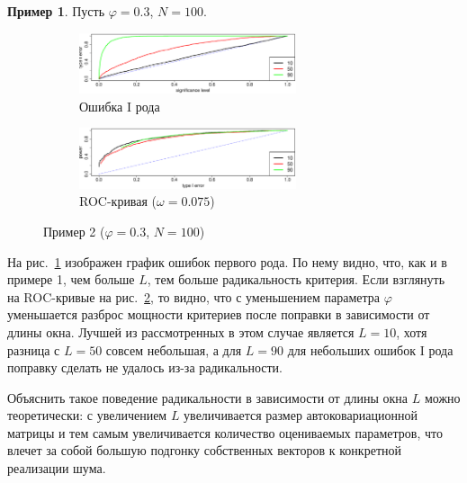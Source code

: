 \documentclass[specialist,
substylefile = spbu_report.rtx,
subf,href,colorlinks=true, 12pt]{disser}
\theoremstyle{definition}
\newtheorem{example}{Пример}
\begin{document}
\begin{example}\label{example2}
	Пусть $\varphi=0.3$, $N=100$.
	\begin{figure}[h!]
		\captionsetup[subfigure]{justification=Centering}
		\begin{subfigure}[t]{\textwidth}
			\centering
			\includegraphics[width=0.7\textwidth]{../cps2024/images/alphaI_phi3_N100.eps}
			\caption{Ошибка I рода}
			\label{alphaI_phi3_N100}
		\end{subfigure}
		\begin{subfigure}[t]{\textwidth}
			\centering
			\includegraphics[width=0.7\textwidth]{../cps2024/images/roc_phi3_N100.eps}
			\caption{ROC-кривая ($\omega=0.075$)}
			\label{roc_phi3_N100}
		\end{subfigure}
	\label{fig:example2}
	\caption{Пример 2 ($\varphi=0.3$, $N=100$)}
	\end{figure}
	На рис.~\ref{alphaI_phi3_N100} изображен график ошибок первого рода. По нему видно, что, как и в примере 1, чем больше $L$, тем больше радикальность критерия. Если взглянуть на ROC-кривые на рис.~\ref{roc_phi3_N100}, то видно, что с уменьшением параметра $\varphi$ уменьшается разброс мощности критериев после поправки в зависимости от длины окна. Лучшей из рассмотренных в этом случае является $L=10$, хотя разница с $L=50$ совсем небольшая, а для $L=90$ для небольших ошибок I рода поправку сделать не удалось из-за радикальности.
\end{example}

Объяснить такое поведение радикальности в зависимости от длины окна $L$ можно теоретически: с увеличением $L$ увеличивается размер автоковариационной матрицы и тем самым увеличивается количество оцениваемых параметров, что влечет за собой большую подгонку собственных векторов к конкретной реализации шума.
\end{document}

